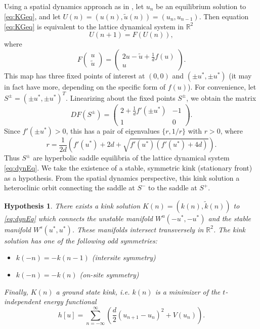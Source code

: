 \documentclass[12pt]{article}
\def\R{{\mathbb R}}
\newtheorem{hypothesis}{Hypothesis}
\begin{document}
Using a spatial dynamics approach as in \cite{Parker2020}, let $u_n$ be an equilibrium solution to \cref{eq:KGeq}, and let $U(n) = (u(n), \tilde{u}(n)) = (u_n, u_{n-1})$. Then equation \cref{eq:KGeq} is equivalent to the lattice dynamical system in $\R^2$
\begin{equation}\label{eq:dynEq}
U(n+1) = F(U(n)),
\end{equation}
where
\[
F\begin{pmatrix}u \\ \tilde{u} \end{pmatrix} =
\begin{pmatrix}2u - \tilde{u} + \frac{1}{d}f(u) \\
u
\end{pmatrix}.
\]
This map has three fixed points of interest at $(0,0)$ and $(\pm u^*, \pm u^*)$ (it may in fact have more, depending on the specific form of $f(u)$). For convenience, let $S^\pm = (\pm u^*, \pm u^*)^T$. Linearizing about the fixed points $S^\pm$, we obtain the matrix 
\[
D F(S^\pm)=
\begin{pmatrix}2 + \frac{1}{d}f'(\pm u^*) & -1 \\ 1 & 0
\end{pmatrix}.
\]
Since $f'(\pm u^*) > 0$, this has a pair of eigenvalues $\{ r, 1/r \}$ with $r > 0$, where
\begin{equation}\label{eq:r}
r = \frac{1}{2d}\left( f'(u^*) + 2d + \sqrt{f'(u^*)(f'(u^*) + 4d)} \right).
\end{equation}
Thus $S^\pm$ are hyperbolic saddle equilibria of the lattice dynamical system \cref{eq:dynEq}. We take the existence of a stable, symmetric kink (stationary front) as a hypothesis. From the spatial dynamics perspective, this kink solution a heteroclinic orbit connecting the saddle at $S^-$ to the saddle at $S^+$.

\begin{hypothesis}\label{hyp:kinkexists}
There exists a kink solution $K(n) = (k(n),\tilde{k}(n))$ to \cref{eq:dynEq} which connects the unstable manifold $W^u(-u^*, -u^*)$ and the stable manifold $W^s(u^*, u^*)$. These manifolds intersect transversely in $\R^2$. The kink solution has one of the following odd symmetries:
\begin{itemize}
	\item $k(-n) = -k(n-1)$ (intersite symmetry)
	\item $k(-n) = -k(n)$ (on-site symmetry)
\end{itemize}
Finally, $K(n)$ a ground state kink, i.e. $k(n)$ is a minimizer of the $t$-independent energy functional
\begin{equation}
h[u] = \sum_{n=-\infty}^\infty 
\left( \frac{d}{2} (u_{n+1} - u_n)^2 + V(u_n) \right).
\end{equation}
\end{hypothesis}
\end{document}

